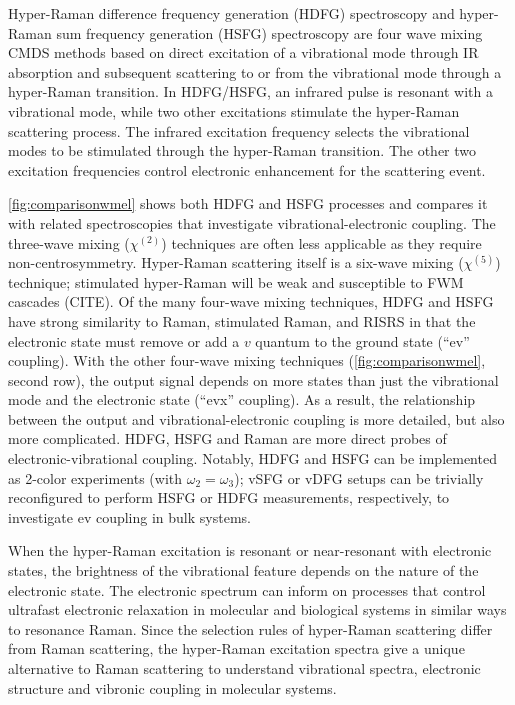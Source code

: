 \documentclass[aip, jcp, reprint, onecolumn]{revtex4-2}
\begin{document}
Hyper-Raman difference frequency generation (HDFG) spectroscopy and hyper-Raman sum frequency generation (HSFG) spectroscopy are four wave mixing CMDS methods based on direct excitation of a vibrational mode through IR absorption and subsequent scattering to or from the vibrational mode through a hyper-Raman transition.
In HDFG/HSFG, an infrared pulse is resonant with a vibrational mode, while two other excitations stimulate the hyper-Raman scattering process.
The infrared excitation frequency selects the vibrational modes to be stimulated through the hyper-Raman transition.
The other two excitation frequencies control electronic enhancement for the scattering event.

\autoref{fig:comparisonwmel} shows both HDFG and HSFG processes and compares it with related spectroscopies that investigate vibrational-electronic coupling.
The three-wave mixing ($\chi^{(2)}$) techniques are often less applicable as they require non-centrosymmetry.
Hyper-Raman scattering itself is a six-wave mixing ($\chi^{(5)}$) technique; stimulated hyper-Raman will be weak and susceptible to FWM cascades (CITE).
Of the many four-wave mixing techniques, HDFG and HSFG have strong similarity to Raman, stimulated Raman, and RISRS in that the electronic state must remove or add a $v$ quantum to the ground state (``ev'' coupling).
With the other four-wave mixing techniques (\autoref{fig:comparisonwmel}, second row), the output signal depends on more states than just the vibrational mode and the electronic state (``evx'' coupling). 
As a result, the relationship between the output and vibrational-electronic coupling is more detailed, but also more complicated.
HDFG, HSFG and Raman are more direct probes of electronic-vibrational coupling.
Notably, HDFG and HSFG can be implemented as 2-color experiments (with $\omega_2=\omega_3$); vSFG or vDFG setups can be trivially reconfigured to perform HSFG or HDFG measurements, respectively, to investigate ev coupling in bulk systems.

When the hyper-Raman excitation is resonant or near-resonant with electronic states, the brightness of the vibrational feature depends on the nature of the electronic state.
The electronic spectrum can inform on processes that control ultrafast electronic relaxation in molecular and biological systems in similar ways to resonance Raman.\cite{Bredenbeck2015, Arsenault2021}
Since the selection rules of hyper-Raman scattering differ from Raman scattering, the hyper-Raman excitation spectra give a unique alternative to Raman scattering to understand vibrational spectra, electronic structure and vibronic coupling in molecular systems. \cite{Olson2018}
\end{document}
